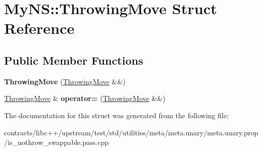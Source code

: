 \hypertarget{struct_my_n_s_1_1_throwing_move}{}\section{My\+NS\+:\+:Throwing\+Move Struct Reference}
\label{struct_my_n_s_1_1_throwing_move}
\subsection*{Public Member Functions}
\begin{DoxyCompactItemize}
\item 
\mbox{\label{struct_my_n_s_1_1_throwing_move_a95860a9437476c3d7a36ea17e3520532}} 
{\bfseries Throwing\+Move} (\mbox{\hyperlink{struct_my_n_s_1_1_throwing_move}{Throwing\+Move}} \&\&)
\item 
\mbox{\label{struct_my_n_s_1_1_throwing_move_a4b63b96a3b6ead7a40942725ee09050e}} 
\mbox{\hyperlink{struct_my_n_s_1_1_throwing_move}{Throwing\+Move}} \& {\bfseries operator=} (\mbox{\hyperlink{struct_my_n_s_1_1_throwing_move}{Throwing\+Move}} \&\&)
\end{DoxyCompactItemize}


The documentation for this struct was generated from the following file\+:\begin{DoxyCompactItemize}
\item 
contracts/libc++/upstream/test/std/utilities/meta/meta.\+unary/meta.\+unary.\+prop/is\+\_\+nothrow\+\_\+swappable.\+pass.\+cpp\end{DoxyCompactItemize}
